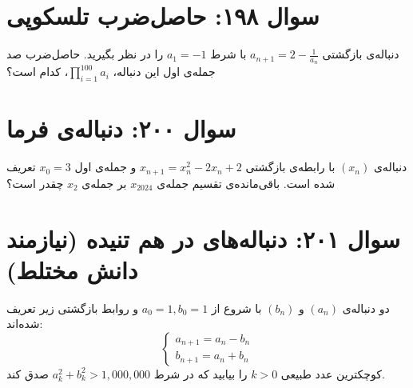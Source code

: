 \documentclass[12pt]{article}
\begin{document}
\vspace{1cm}
\hrulefill
\vspace{1cm}


\section*{سوال ۱۹۸: حاصل‌ضرب تلسکوپی}
دنباله‌ی بازگشتی \( a_{n+1} = 2 - \frac{1}{a_n} \) با شرط \( a_1 = -1 \) را در نظر بگیرید. حاصل‌ضرب صد جمله‌ی اول این دنباله، \(\prod_{i=1}^{100} a_i\)، کدام است؟


\vspace{1cm}
\hrulefill
\vspace{1cm}






\section*{سوال ۲۰۰: دنباله‌ی فرما}
دنباله‌ی \( (x_n) \) با رابطه‌ی بازگشتی \( x_{n+1} = x_n^2 - 2x_n + 2 \) و جمله‌ی اول \( x_0 = 3 \) تعریف شده است. باقی‌مانده‌ی تقسیم جمله‌ی \(x_{2024}\) بر جمله‌ی \(x_2\) چقدر است؟



\vspace{1cm}
\hrulefill
\vspace{1cm}



\section*{سوال ۲۰۱: دنباله‌های در هم تنیده (نیازمند دانش مختلط)}
دو دنباله‌ی \( (a_n) \) و \( (b_n) \) با شروع از \(a_0=1, b_0=1\) و روابط بازگشتی زیر تعریف شده‌اند:
\[ \begin{cases} a_{n+1} = a_n - b_n \\ b_{n+1} = a_n + b_n \end{cases} \]
کوچکترین عدد طبیعی \(k > 0\) را بیابید که در شرط \( a_k^2 + b_k^2 > 1,000,000 \) صدق کند.
\end{document}
